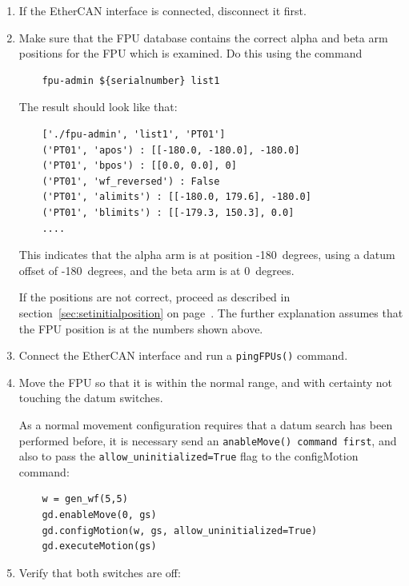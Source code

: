 \documentclass[fontsize=12,a4paper]{scrreprt}
\begin{document}
\begin{enumerate}
\item If the EtherCAN interface is connected, disconnect it first.

\item Make sure that the FPU database contains the correct alpha and
  beta arm positions for the FPU which is examined. Do this using
  the command
  \begin{verbatim}
    fpu-admin ${serialnumber} list1
  \end{verbatim}

  The result should look like that:

  \begin{verbatim}
    ['./fpu-admin', 'list1', 'PT01']
    ('PT01', 'apos') : [[-180.0, -180.0], -180.0]
    ('PT01', 'bpos') : [[0.0, 0.0], 0]
    ('PT01', 'wf_reversed') : False
    ('PT01', 'alimits') : [[-180.0, 179.6], -180.0]
    ('PT01', 'blimits') : [[-179.3, 150.3], 0.0]
    ....
  \end{verbatim}

  This indicates that the alpha arm is at position -180\degree\ degrees,
  using a datum offset of -180\degree\ degrees, and the beta arm is at
  0\degree\ degrees.

  If the positions are not correct, proceed as described in
  section~\ref{sec:setinitialposition} on
  page~\pageref{sec:setinitialposition}. The further explanation
  assumes that the FPU position is at the numbers shown above.

\item Connect the EtherCAN interface and run a \texttt{pingFPUs()} command.

\item Move the FPU so that it is within the normal range, and with
  certainty not touching the datum switches.

  As a normal movement configuration requires
  that a datum search has been performed before,
  it is necessary send an \texttt{anableMove() command first}, and
  also to pass the \texttt{allow\_uninitialized=True}
  flag to the configMotion command:

  \begin{verbatim}
    w = gen_wf(5,5)
    gd.enableMove(0, gs)
    gd.configMotion(w, gs, allow_uninitialized=True)
    gd.executeMotion(gs)
  \end{verbatim}

\item Verify that both switches are off:


\end{enumerate}
\end{document}
